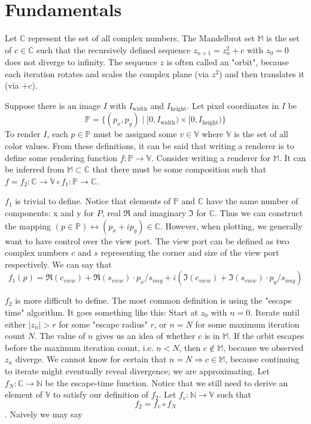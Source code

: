 \documentclass{article}
\begin{document}
\section{Fundamentals}
\par Let $\mathbb{C}$ represent the set of all complex numbers. The Mandelbrot set $\mathbb{M}$ is the set of $c\in\mathbb{C}$ such that the recursively defined sequence $z_{n+1} = z_n^2 + c$ with $z_0 = 0$ does not diverge to infinity. The sequence $z$ is often called an "orbit", because each iteration rotates and scales the complex plane (via $z^2$) and then translates it (via $+c$).
\par Suppose there is an image $I$ with $I_\textrm{width}$ and $I_\textrm{height}$. Let pixel coordinates in $I$ be\[\mathbb{P}= \{(p_x,p_y) \mid [0,I_\textrm{width}) \times [0,I_\textrm{height})\}\]To render $I$, each $p\in\mathbb{P}$ must be assigned some $v\in\mathbb{V}$ where $\mathbb{V}$ is the set of all color values. From these definitions, it can be said that writing a renderer is to define some rendering function $f:\mathbb{P}\rightarrow \mathbb{V}$. Consider writing a renderer for $\mathbb{M}$. It can be inferred from $\mathbb{M}\subset\mathbb{C}$ that there must be some composition such that $f = f_2:\mathbb{C} \rightarrow \mathbb{V} \circ f_1:\mathbb{P} \rightarrow \mathbb{C}$.
\par $f_1$ is trivial to define. Notice that elements of $\mathbb{P}$ and $\mathbb{C}$ have the same number of components: x and y for $P$, real $\Re$ and imaginary $\Im$ for $\mathbb{C}$. Thus we can construct the mapping $(p\in \mathbb{P})\leftrightarrow (p_x + ip_y)\in\mathbb{C}$. However, when plotting, we generally want to have control over the view port. The view port can be defined as two complex numbers $c$ and $s$ representing the corner and size of the view port respectively. We can say that \[f_1(p)=\Re(c_{view}) + \Re(s_{view}) \cdot p_x/s_{img} + i\left(\Im(c_{view}) + \Im(s_{view}) \cdot p_y/s_{img}\right)\]
\par $f_2$ is more difficult to define. The most common definition is using the "escape time" algorithm. It goes something like this: Start at $z_0$ with $n=0$. Iterate until either $|z_n| > r$ for some "escape radius" $r$, or $n = N$ for some maximum iteration count $N$. The value of $n$ gives us an idea of whether $c$ is in $\mathbb{M}$. If the orbit escapes before the maximum iteration count, i.e. $n < N$, then $c \notin \mathbb{M}$, because we observed $z_n$ diverge. We cannot know for certain that $n = N \Rightarrow c \in \mathbb{M}$, because continuing to iterate might eventually reveal divergence; we are approximating. Let $f_N:\mathbb{C}\rightarrow \mathbb{N}$ be the escape-time function. Notice that we still need to derive an element of $\mathbb{V}$ to satisfy our definition of $f_2$. Let $f_v:\mathbb{N}\rightarrow \mathbb{V}$ such that \[f_2 = f_v \circ f_N\]. Naively we may say
\end{document}
